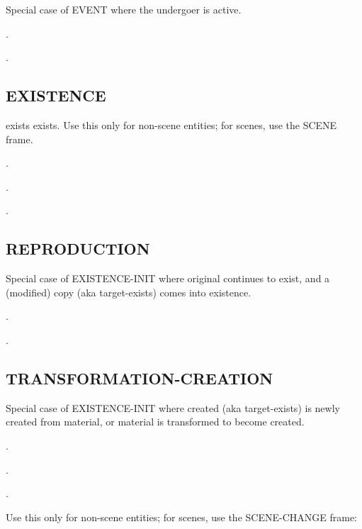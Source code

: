 \documentclass[a4paper]{article}
\newcommand{\fr}[1]{\textsf{#1}}
\newcommand{\rl}[1]{\textsf{#1}}
\begin{document}
Special case of \fr{EVENT} where the \rl{undergoer} is active.

\ex.

\ex.


\newpage\subsection{ \fr{EXISTENCE}}
\label{sec:EXISTENCE}

\rl{exists} exists. Use this only for non-scene entities; for scenes, use the \fr{SCENE} frame.

\ex.

\ex.

\ex.


\newpage\subsection{ \fr{REPRODUCTION}}
\label{sec:REPRODUCTION}

Special case of \fr{EXISTENCE-INIT} where \rl{original} continues to exist, and
a (modified) \rl{copy} (aka \rl{target-exists}) comes into existence.

\ex.

\ex.


\newpage\subsection{ \fr{TRANSFORMATION-CREATION}}
\label{sec:TRANSFORMATION-CREATION}

Special case of \fr{EXISTENCE-INIT} where \rl{created} (aka \rl{target-exists})
is newly created from \rl{material}, or \rl{material} is transformed to become
\rl{created}.

\ex.

\ex.

\ex.

Use this only for non-scene entities; for scenes, use the \fr{SCENE-CHANGE}
frame:
\end{document}
